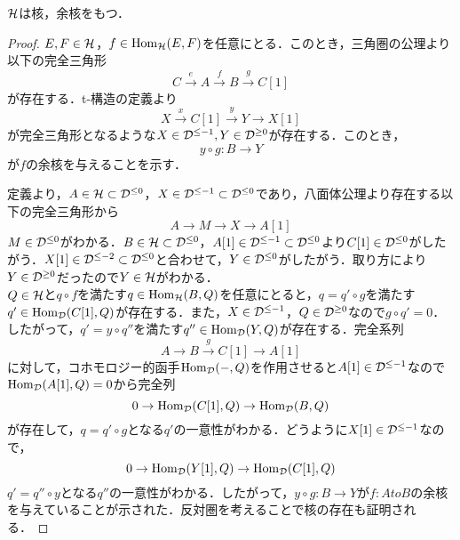 \begin{lemm}\cite{BBD}
	${\mathcal H}$は核，余核をもつ．
\end{lemm}
\begin{proof}
	$E,F\in{\mathcal H}$，$f\in\operatorname{\mathrm{Hom}}_{{\mathcal H}}(E,F)$を任意にとる．このとき，三角圏の公理より以下の完全三角形
	\[C\xrightarrow{e}A\xrightarrow{f}B\xrightarrow{g}C[1]\]
	が存在する．t-構造の定義より
	\[X\xrightarrow{x}C[1]\xrightarrow{y}Y\rightarrow X[1]\]
	が完全三角形となるような$X\in {\mathcal D}^{\le -1},Y\in {\mathcal D}^{\ge 0}$が存在する．このとき，
	\[y\circ g\colon B\rightarrow Y\]
	が$f$の余核を与えることを示す．
	\begin{comment}
			\[
				\begin{tikzcd}[column sep=huge,row sep =huge]
					B[-1] \ar[r,"g\texttt{[-1]}"]\ar[d,equal]& C\ar[r,]\ar[d,"y\texttt{[-1]}",swap]& A\ar[d,"\ell",dotted] \ar[r,"f"]& B\ar[d,equal]\\
					B[-1] \ar[r,"y\texttt{[-1]}\circ g\texttt{[-1]}"]\ar[d,"g\texttt{[-1]}",swap]& Y[-1]\ar[r,]\ar[d,equal]& M\ar[d,dotted] \ar[r,"m"]& B\ar[d,"g"]\\
					C \ar[r,]\ar[d,swap]& Y[-1]\ar[r,]\ar[d,swap]& X \ar[r,"x"]\ar[d,equal]& C[1] \ar[d,]\\
			A \ar[r,"\ell",dotted]& M\ar[r,dotted]&  X\ar[r,dotted]& A[1]\\
		\end{tikzcd}
			\]
\end{comment}	
			定義より，$A\in{\mathcal H}\subset{\mathcal D}^{\le 0}$，$X\in{\mathcal D}^{\le -1}\subset{\mathcal D}^{\le 0}$であり，八面体公理より存在する以下の完全三角形から
	\[A\rightarrow M\rightarrow X\rightarrow A[1]\]
	$M\in{\mathcal D}^{\le 0}$がわかる．$B\in{\mathcal H}\subset{\mathcal D}^{\le 0}$，$A[1]\in {\mathcal D}^{\le -1}\subset {\mathcal D}^{\le 0}$より$C[1]\in{\mathcal D}^{\le 0}$がしたがう．$X[1]\in{\mathcal D}^{\le -2}\subset{\mathcal D}^{\le 0}$と合わせて，$Y\in{\mathcal D}^{\le 0}$がしたがう．取り方により$Y\in{\mathcal D}^{\ge 0}$だったので$Y\in{\mathcal H}$がわかる．\\
	$Q\in{\mathcal H}$と$q\circ f$を満たす$q\in\operatorname{\mathrm{Hom}}_{{\mathcal H}}(B,Q)$を任意にとると，$q=q'\circ g$を満たす$q'\in\operatorname{\mathrm{Hom}}_{{\mathcal D}}(C[1],Q)$が存在する．また，$X\in{\mathcal D}^{\le -1}$，$Q\in{\mathcal D}^{\ge 0}$なので$g\circ q'=0$．したがって，$q'=y\circ q''$を満たす$q''\in\operatorname{\mathrm{Hom}}_{{\mathcal D}}(Y,Q)$が存在する．完全系列
	\[A\rightarrow B\xrightarrow{g} C[1]\rightarrow A[1]\]
	に対して，コホモロジー的函手$\operatorname{\mathrm{Hom}}_{{\mathcal D}}(-,Q)$を作用させると$A[1]\in{\mathcal D}^{\le -1}$なので$\operatorname{\mathrm{Hom}}_{{\mathcal D}}(A[1],Q)=0$から完全列
	\[0\rightarrow \operatorname{\mathrm{Hom}}_{{\mathcal D}}(C[1],Q) \rightarrow \operatorname{\mathrm{Hom}}_{{\mathcal D}}(B,Q)\]
	が存在して，$q=q'\circ g$となる$q'$の一意性がわかる．どうように$X[1]\in{\mathcal D}^{\le -1}$なので，
	\[0\rightarrow \operatorname{\mathrm{Hom}}_{{\mathcal D}}(Y[1],Q) \rightarrow \operatorname{\mathrm{Hom}}_{{\mathcal D}}(C[1],Q)\]
	$q'=q''\circ y$となる$q''$の一意性がわかる．したがって，$y\circ g\colon B\to Y$が$f\colon Ato B$の余核を与えていることが示された．反対圏を考えることで核の存在も証明される．
\end{proof}

